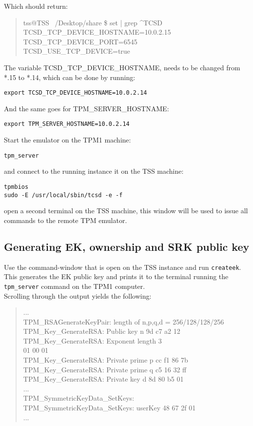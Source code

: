 \documentclass[10pt]{article}
\newcommand{\command}[1]{\texttt{#1}}
\begin{document}
      Which should return:

      \begin{quote}
        tss@TSS ~/Desktop/share \$ set | grep \textasciicircum TCSD\\
        TCSD\_TCP\_DEVICE\_HOSTNAME=10.0.2.15\\
        TCSD\_TCP\_DEVICE\_PORT=6545\\
        TCSD\_USE\_TCP\_DEVICE=true
      \end{quote}

      The variable TCSD\_TCP\_DEVICE\_HOSTNAME, needs to be changed from *.15 to
      *.14, which can be done by running:

      \command{export TCSD\_TCP\_DEVICE\_HOSTNAME=10.0.2.14}

      And the same goes for TPM\_SERVER\_HOSTNAME:

      \command{export TPM\_SERVER\_HOSTNAME=10.0.2.14}

      Start the emulator on the TPM1 machine:

      \command{tpm\_server}

      and connect to the running instance it on the TSS machine:

      \command{tpmbios} \\
      \command{sudo -E /usr/local/sbin/tcsd -e -f}

      open a second terminal on the TSS machine, this window will be used to
      issue all commands to the remote TPM emulator.

    \subsection{Generating EK, ownership and SRK public key}

      Use the command-window that is open on the TSS instance and run
      \command{createek}. This generates the EK public key and prints
      it to the terminal running the \command{tpm\_server} command
      on the TPM1 computer. \\

      Scrolling through the output yields the following:

      \begin{quote}
        ...\\
        TPM\_RSAGenerateKeyPair: length of n,p,q,d = 256/128/128/256\\
        TPM\_Key\_GenerateRSA: Public key n 9d c7 a2 12\\
        TPM\_Key\_GenerateRSA: Exponent length 3\\
        01 00 01\\
        TPM\_Key\_GenerateRSA: Private prime p cc f1 86 7b\\
        TPM\_Key\_GenerateRSA: Private prime q c5 16 32 ff\\
        TPM\_Key\_GenerateRSA: Private key d 8d 80 b5 01\\
        ...\\
        TPM\_SymmetricKeyData\_SetKeys:\\
        TPM\_SymmetricKeyData\_SetKeys: userKey 48 67 2f 01\\
        ...
      \end{quote}
\end{document}
